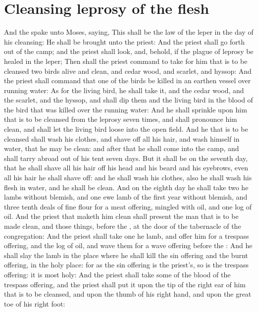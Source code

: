 \section*{Cleansing leprosy of the flesh}
\begin{biblechapter} %
\verse And the \LORD spake unto Moses, saying,
\verse This shall be the law of the leper in the day of his cleansing: He shall be brought unto the priest:
\verse And the priest shall go forth out of the camp; and the priest shall look, and, behold, if the plague of leprosy be healed in the leper;
\verse Then shall the priest command to take for him that is to be cleansed two birds alive and clean, and cedar wood, and scarlet, and hyssop:
\verse And the priest shall command that one of the birds be killed in an earthen vessel over running water:
\verse As for the living bird, he shall take it, and the cedar wood, and the scarlet, and the hyssop, and shall dip them and the living bird in the blood of the bird that was killed over the running water:
\verse And he shall sprinkle upon him that is to be cleansed from the leprosy seven times, and shall pronounce him clean, and shall let the living bird loose into the open field.
\verse And he that is to be cleansed shall wash his clothes, and shave off all his hair, and wash himself in water, that he may be clean: and after that he shall come into the camp, and shall tarry abroad out of his tent seven days.
\verse But it shall be on the seventh day, that he shall shave all his hair off his head and his beard and his eyebrows, even all his hair he shall shave off: and he shall wash his clothes, also he shall wash his flesh in water, and he shall be clean.
\verse And on the eighth day he shall take two he lambs without blemish, and one ewe lamb of the first year without blemish, and three tenth deals of fine flour for a meat offering, mingled with oil, and one log of oil.
\verse And the priest that maketh him clean shall present the man that is to be made clean, and those things, before the \LORD, at the door of the tabernacle of the congregation:
\verse And the priest shall take one he lamb, and offer him for a trespass offering, and the log of oil, and wave them for a wave offering before the \LORD:
\verse And he shall slay the lamb in the place where he shall kill the sin offering and the burnt offering, in the holy place: for as the sin offering is the priest's, so is the trespass offering: it is most holy:
\verse And the priest shall take some of the blood of the trespass offering, and the priest shall put it upon the tip of the right ear of him that is to be cleansed, and upon the thumb of his right hand, and upon the great toe of his right foot:

\end{biblechapter}
